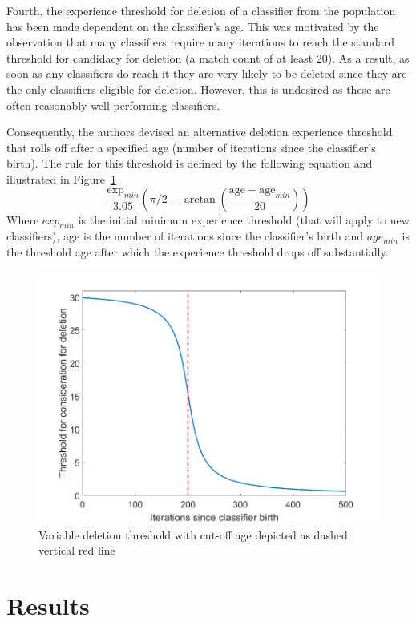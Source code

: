 \documentclass[11pt]{article}
\begin{document}
Fourth, the experience threshold for deletion of a classifier from the population has been made dependent on the classifier's age. This was motivated by the observation that many classifiers require many iterations to reach the standard threshold for candidacy for deletion (a match count of at least 20). As a result, as soon as any classifiers do reach it they are very likely to be deleted since they are the only classifiers eligible for deletion. However, this is undesired as these are often reasonably well-performing classifiers.

Consequently, the authors devised an alternative deletion experience threshold that rolls off after a specified age (number of iterations since the classifier's birth). The rule for this threshold is defined by the following equation and illustrated in Figure~\ref{fig:deletionthreshold}
\[
	\frac{\textrm{exp}_{min}}{3.05}
	\left(
	\pi/2-\arctan\left(\frac{\textrm{age} - \textrm{age}_{min}}{20} \right) \right)
\]
Where $exp_{min}$ is the initial minimum experience threshold (that will apply to new classifiers), age is the number of iterations since the classifier's birth and $age_{min}$ is the threshold age after which the experience threshold drops off substantially.

\begin{figure}[!htbp]
	\centering
	\includegraphics[width=0.7\linewidth]{figures/deletionThreshold.png}
	\caption{Variable deletion threshold with cut-off age depicted as dashed vertical red line}
	\label{fig:deletionthreshold}
\end{figure}



\section{Results}

\end{document}
